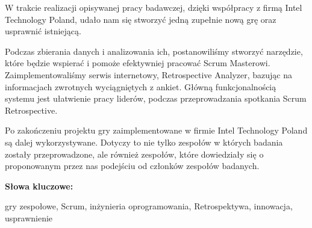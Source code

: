 \tab W trakcie realizacji opisywanej pracy badawczej, dzięki współpracy z firmą Intel Technology Poland, udało nam się stworzyć jedną zupełnie nową grę oraz usprawnić istniejącą.

\tab Podczas zbierania danych i analizowania ich, postanowiliśmy stworzyć narzędzie, które będzie wspierać i pomoże efektywniej pracować Scrum Masterowi. Zaimplementowaliśmy serwis internetowy, Retrospective Analyzer, bazując na informacjach zwrotnych wyciągniętych z ankiet. Główną funkcjonalnością systemu jest ułatwienie pracy liderów, podczas przeprowadzania spotkania Scrum Retrospective.

\tab Po zakończeniu projektu gry zaimplementowane w firmie Intel Technology Poland są  dalej wykorzystywane. Dotyczy to nie tylko zespołów w których badania zostały przeprowadzone, ale również zespołów, które dowiedziały się o proponowanym przez nas podejściu od członków zespołów badanych.

\vspace{12pt}
\noindent\textbf{Słowa kluczowe:}

\vspace{6pt}
\noindent gry zespołowe, Scrum, inżynieria oprogramowania, Retrospektywa, innowacja, usprawnienie

